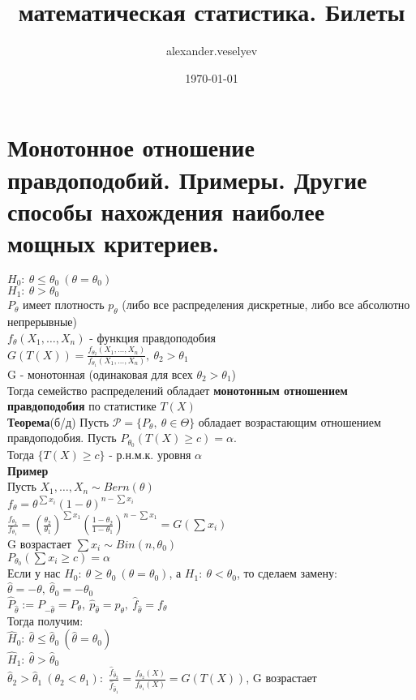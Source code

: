 \documentclass{article}
\title{математическая статистика. Билеты}
\author{alexander.veselyev }
\date{\today}
\begin{document}
\section{Монотонное отношение правдоподобий. Примеры. Другие способы нахождения наиболее мощных критериев.}

$H_0:\ \theta\leq\theta_0\ (\theta=\theta_0)$\\
$H_1:\ \theta>\theta_0$\\

$P_\theta$ имеет плотность $p_\theta$ (либо все распределения дискретные, либо все абсолютно непрерывные)\\

$f_\theta(X_1,\dots,X_n)$ - функция правдоподобия\\

$G(T(X)) = \frac{f_{\theta_2}(X_1,\dots,X_n)}{f_{\theta_1}(X_1,\dots,X_n)},\ \theta_2>\theta_1$\\
G - монотонная (одинаковая для всех $\theta_2>\theta_1$)\\

Тогда семейство распределений обладает \textbf{монотонным отношением правдоподобия} по статистике $T(X)$\\

\textbf{Теорема}(б/д) Пусть $\mathcal{P} = \{ P_\theta,\ \theta\in\Theta  \}$ обладает возрастающим отношением правдоподобия. Пусть $P_{\theta_0}(T(X)\geq c) = \alpha$.\\
Тогда $\{T(X)\geq c\}$ - р.н.м.к. уровня $\alpha$\\
\textbf{Пример}\\
Пусть $X_1,\dots,X_n\sim Bern(\theta)$\\
$f_\theta = \theta^{\sum{x_i}}(1-\theta)^{n - \sum{x_i}}$\\
$\frac{f_{\theta_2}}{f_{\theta_1}} = \left( \frac{\theta_2}{\theta_1}  \right)^{\sum{x_1}} \left( \frac{1 - \theta_2}{1 - \theta_1}  \right)^{n - \sum{x_1}} = G(\sum{x_i})$\\
G возрастает $\sum{x_i}\sim Bin(n, \theta_0)$\\
$P_{\theta_0}(\sum{x_i} \geq c) = \alpha$\\


Если у нас $H_0:\ \theta\geq\theta_0\ (\theta=\theta_0)$, а $H_1:\ \theta<\theta_0$, то сделаем замену:\\
$\hat{\theta} = -\theta,\ \hat{\theta}_0 = -\theta_0$\\
$\hat{P}_{\hat{\theta}} := P_{-\hat{\theta}} = P_\theta,\ \hat{p}_{\hat{\theta}} = p_\theta,\ \hat{f}_{\hat{\theta}} = f_\theta$\\
Тогда получим:\\
$\hat{H}_0:\ \hat{\theta}\leq\hat{\theta}_0\ (\hat{\theta} = \hat{\theta}_0)$\\
$\hat{H}_1:\ \hat{\theta}>\hat{\theta}_0$\\
$\hat{\theta}_2 > \hat{\theta}_1\ (\theta_2 < \theta_1):$ 
$\frac{\hat{f}_{\hat{\theta}_2}}{\hat{f}_{\hat{\theta}_1}} = \frac{f_{\theta_2}(X)}{f_{\theta_1}(X)} = G(T(X))$, G возрастает\\
\end{document}
